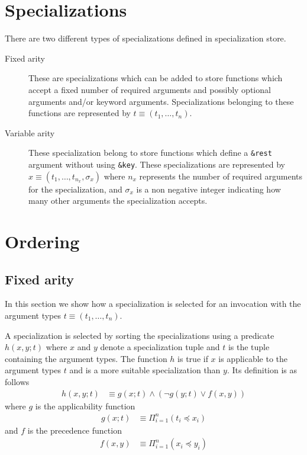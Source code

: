 \documentclass{article}
\begin{document}
\section{Specializations}
There are two different types of specializations defined in
specialization store.
\begin{description}
\item[Fixed arity] These are specializations which can be added to
  store functions which accept a fixed number of required arguments
  and possibly optional arguments and/or keyword
  arguments. Specializations belonging to these functions are
  represented by $ t \equiv (t_1, \dots, t_n) $.
\item[Variable arity] These specialization belong to store functions
  which define a \texttt{\&rest} argument without using
  \texttt{\&key}. These specializations are represented by
  $ x \equiv (t_{1}, \dots, t_{n_x}, \sigma_x) $ where $n_x$
  represents the number of required arguments for the specialization,
  and $\sigma_x$ is a non negative integer indicating how many other
  arguments the specialization accepts.
\end{description}

\section{Ordering}
\label{sec:ordering}
\subsection{Fixed arity}
In this section we show how a specialization is selected for an
invocation with the argument types $t \equiv (t_1, \dots, t_n)$.

A specialization is selected by sorting the specializations using a
predicate $h(x,y;t)$ where $x$ and $y$ denote a specialization tuple
and $t$ is the tuple containing the argument types. The function $h$
is true if $x$ is applicable to the argument types $t$ and is a more
suitable specialization than $y$. Its definition is as follows
\begin{align}
  h(x,y;t) &\equiv g(x;t) \land (\lnot g(y;t) \lor f(x,y) )
\end{align}
where $g$ is the applicability function
\begin{align}
  g(x;t) &\equiv \Pi_{i=1}^n (t_i \preceq x_i)
\end{align}
and $f$ is the precedence function
\begin{align}
  f(x,y) &\equiv \Pi_{i=1}^n (x_i \preceq y_i)
\end{align}
\end{document}
